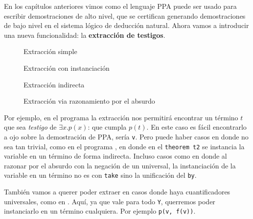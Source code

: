 En los capítulos anteriores vimos como el lenguaje PPA puede ser usado para
escribir demostraciones de alto nivel, que se certifican generando
demostraciones de bajo nivel en el sistema lógico de deducción natural.
Ahora vamos a introducir una nueva funcionalidad: la \textbf{extracción de testigos}.

\begin{multicols}{2}
    \begin{figure}[H]
        
        \caption{Extracción simple}
        \label{fri:prog:exists}
    \end{figure}

    \begin{figure}[H]
        
        \caption{Extracción con instanciación}
        \label{fri:prog:forall}
    \end{figure}
    \begin{figure}[H]
        
        \caption{Extracción indirecta}
        \label{fri:prog:indirect}
    \end{figure}
\end{multicols}

\begin{figure}[h]
    
    \caption{Extracción via razonamiento por el absurdo}
    \label{fri:prog:indirect-abs}
\end{figure}

Por ejemplo, en el programa  la extracción nos
permitirá encontrar un término $t$ que sea \textit{testigo} de $\exists x. p(x)$: que cumpla $p(t)$. En este caso es fácil encontrarlo a ojo sobre la
demostración de PPA, sería \lstinline{v}. Pero puede haber casos en donde no sea
tan trivial, como en el programa , en donde en el
\lstinline{theorem t2} se instancia la variable en un término de forma
indirecta. Incluso casos como  en donde al razonar por el absurdo con la negación de un universal, la instanciación de la variable en un término no es con \lstinline{take} sino la unificación del \lstinline{by}.

También vamos a querer poder extraer en casos donde haya
cuantificadores universales, como en . Aquí, ya que vale para todo \lstinline{Y}, querremos poder instanciarlo en un término cualquiera. Por ejemplo \lstinline{p(v, f(v))}.

